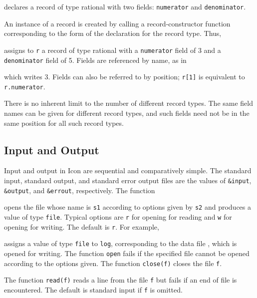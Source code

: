 \noindent
declares a record of type rational with two fields: \texttt{numerator} and
\texttt{denominator}.

An instance of a record is created by calling a record-constructor
function corresponding to the form of the declaration for the record
type. Thus,


\noindent
assigns to \texttt{r} a record of type rational with a \texttt{numerator}
field of 3 and a \texttt{denominator} field of 5. Fields are referenced by
name, as in


\noindent which writes 3. Fields can also be referred to by position;
\texttt{r[1]} is equivalent to \texttt{r.numerator}.

There is no inherent limit to the number of different record
types. The same field names can be given for different record types,
and such fields need not be in the same position for all such record
types.


\subsection{Input and Output}

Input and output in Icon are sequential and comparatively simple. The
standard input, standard output, and standard error output files are
the values of \texttt{\&input}, \texttt{\&output}, and
\texttt{\&errout}, respectively. The function


\noindent opens the file whose name is \texttt{s1} according to
options given by \texttt{s2} and produces a value of type \texttt{file}.
Typical options are \texttt{{\textquotedbl}r{\textquotedbl}} for
opening for reading and \texttt{{\textquotedbl}w{\textquotedbl}} for
opening for writing. The default is
\texttt{{\textquotedbl}r{\textquotedbl}}. For example,


\noindent assigns a value of type \texttt{file} to \texttt{log},
corresponding to the data file , which is opened for
writing. The function \texttt{open} fails if the specified file cannot be
opened according to the options given. The function \texttt{close(f)}
closes the file \texttt{f}.

The function \texttt{read(f)} reads a line from the file \texttt{f}
but fails if an end of file is encountered. The default is standard
input if \texttt{f} is omitted.


